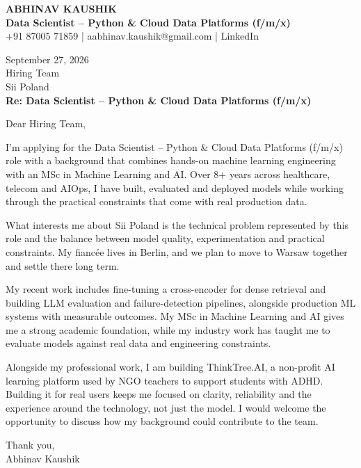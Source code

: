 \documentclass[10pt,a4paper]{article}
\begin{document}
\begin{center}
{\Large\bfseries ABHINAV KAUSHIK}\\[2pt]
{\bfseries Data Scientist – Python \& Cloud Data Platforms (f/m/x)}\\[2pt]
+91 87005 71859 \quad | \quad aabhinav.kaushik@gmail.com \quad | \quad LinkedIn
\end{center}
\vspace{8pt}
September 27, 2026\\[6pt]
Hiring Team\\
Sii Poland\\[4pt]
\textbf{Re: Data Scientist – Python \& Cloud Data Platforms (f/m/x)}

Dear Hiring Team,

I’m applying for the Data Scientist – Python \& Cloud Data Platforms (f/m/x) role with a background that combines hands-on machine learning engineering with an MSc in Machine Learning and AI. Over 8+ years across healthcare, telecom and AIOps, I have built, evaluated and deployed models while working through the practical constraints that come with real production data.

What interests me about Sii Poland is the technical problem represented by this role and the balance between model quality, experimentation and practical constraints. My fiancée lives in Berlin, and we plan to move to Warsaw together and settle there long term.

My recent work includes fine-tuning a cross-encoder for dense retrieval and building LLM evaluation and failure-detection pipelines, alongside production ML systems with measurable outcomes. My MSc in Machine Learning and AI gives me a strong academic foundation, while my industry work has taught me to evaluate models against real data and engineering constraints.

Alongside my professional work, I am building ThinkTree.AI, a non-profit AI learning platform used by NGO teachers to support students with ADHD. Building it for real users keeps me focused on clarity, reliability and the experience around the technology, not just the model. I would welcome the opportunity to discuss how my background could contribute to the team.

Thank you,\\
Abhinav Kaushik
\end{document}
